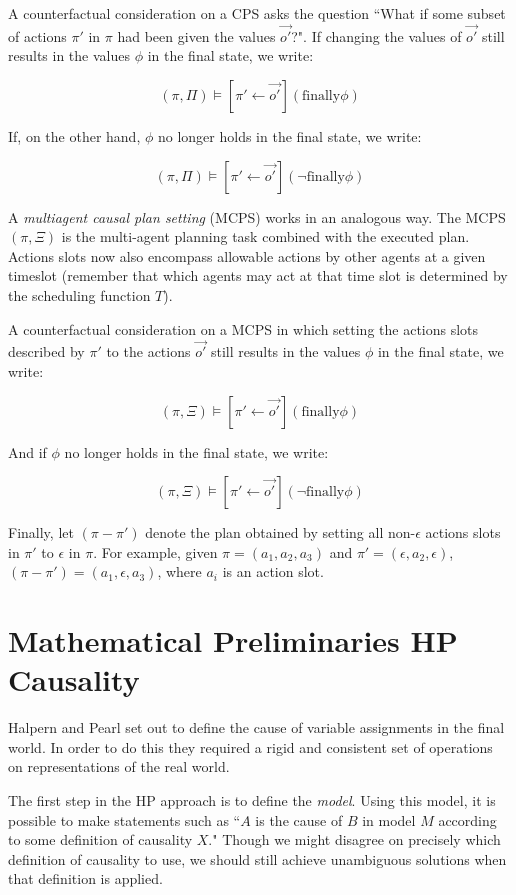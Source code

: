 \documentclass{article}
\theoremstyle{plain}
\theoremstyle{definition}
\begin{document}
A counterfactual consideration on a CPS asks the question ``What if some subset of actions $\pi'$ in $\pi$ had been given the values $\vec{o'}$?". If changing the values of $\vec{o'}$ still results in the values $\phi$ in the final state, we write:

\[
(\pi, \Pi) \models [\pi' \leftarrow \vec{o'}](\textrm{finally} \phi)
\]

If, on the other hand, $\phi$ no longer holds in the final state, we write:

\[
(\pi, \Pi) \models [\pi' \leftarrow \vec{o'}](\lnot \textrm{finally} \phi)
\]


A \textit{multiagent causal plan setting} (MCPS) works in an analogous way. The MCPS $(\pi,\Xi)$ is the multi-agent planning task combined with the executed plan. Actions slots now also encompass allowable actions by other agents at a given timeslot (remember that which agents may act at that time slot is determined by the scheduling function $T$).

A counterfactual consideration on a MCPS in which setting the actions slots described by $\pi'$ to the actions $\vec{o'}$ still results in the values $\phi$ in the final state, we write:

\[
(\pi, \Xi) \models [\pi' \leftarrow \vec{o'}](\textrm{finally} \phi)
\]

And if $\phi$ no longer holds in the final state, we write:

\[
(\pi, \Xi) \models [\pi' \leftarrow \vec{o'}](\lnot \textrm{finally} \phi)
\]

Finally, let $(\pi-\pi')$ denote the plan obtained by setting all non-$\epsilon$ actions slots in $\pi'$ to $\epsilon$ in $\pi$. For example, given $\pi=(a_1,a_2,a_3)$ and $\pi'=(\epsilon, a_2, \epsilon)$, $(\pi-\pi')=(a_1, \epsilon, a_3)$, where $a_i$ is an action slot.

\section{Mathematical Preliminaries HP Causality} \label{hpPreliminaries}

Halpern and Pearl \cite{halpern2005causes} set out to define the cause of variable assignments in the final world. In order to do this they required a rigid and consistent set of operations on representations of the real world.

The first step in the HP approach is to define the \textit{model}. Using this model, it is possible to make statements such as ``$A$ is the cause of $B$ in  model $M$ according to some definition of causality $X$." Though we might disagree on precisely which definition of causality to use, we should still achieve unambiguous solutions when that definition is applied. 
\end{document}
